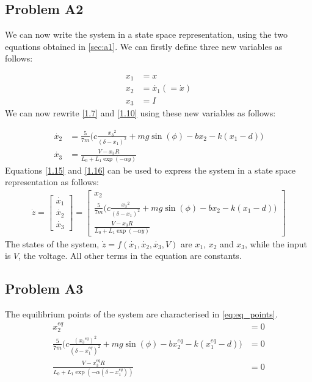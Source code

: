 \documentclass[a4paper,10pt,reqno]{amsart}
\numberwithin{equation}{section}
\begin{document}
\subsection{Problem A2}\label{sec:a2}
We can now write the system in a state space representation, using the two equations obtained in \ref{sec:a1}.
We can firstly define three new variables as follows:

\begin{align}
x_1 &= x \label{1.12} \\
x_2 &= \dot{x_1} (= \dot{x}) \label{1.13} \\
x_3 &= I \label{1.14}
\end{align}
We can now rewrite \eqref{1.7} and \eqref{1.10} using these new variables as follows:

\begin{align}
\dot{x_2} &= \frac{5}{7m}\bigg(c \frac{{x_3}^2}{(\delta - x_1)^2} + mg\sin(\phi) - bx_2 - k(x_1-d)\bigg) \label{1.15} \\
\dot{x_3} &= \frac{V - x_3 R}{L_0 + L_1\exp(-\alpha y)} \label{1.16}
\end{align}
Equations \eqref{1.15} and \eqref{1.16} can be used to express the system in a state space representation as follows:
\begin{align}
\dot{z} = 
\begin{bmatrix}
\dot{x_1}\\
\dot{x_2}\\
\dot{x_3}
\end{bmatrix}
= 
\begin{bmatrix}
x_2 \\
\frac{5}{7m}\bigg(c \frac{{x_3}^2}{(\delta - x_1)^2} + mg\sin(\phi) - bx_2 - k(x_1-d)\bigg)\\
\frac{V - x_3 R}{L_0 + L_1\exp(-\alpha y)}
\end{bmatrix}
\label{1.17}
\end{align}
The states of the system, $\dot{z} = f(\dot{x_1}, \dot{x_2}, \dot{x_3}, V)$ are $x_1$, $x_2$ and $x_3$, while the input is $V$, the voltage. All other terms in the equation are constants.


\subsection{Problem A3}\label{sec:a3}
The equilibrium points of the system are characterised in \eqref{eq:eq_points}.
\begin{subequations}\label{eq:eq_points}
\begin{align}
      x^{eq}_{2} &= 0 \label{1.18a} \\
     \frac{5}{7m}\bigg(c \frac{({x_3}^{eq})^2}{(\delta - x_1^{eq})^2} + mg\sin(\phi) - bx_2^{eq} - k(x_1^{eq}-d)\bigg) &= 0 \label{1.18b} \\
     \frac{V - x_3^{eq}R}{L_0 + L_1\exp(-\alpha(\delta - x_1^{eq}))} &= 0 \label{1.18c}
\end{align}
\end{subequations}
\end{document}
